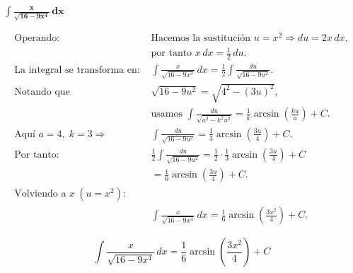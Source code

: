 $\displaystyle \mathbf{\int \frac{x}{\sqrt{16 - 9x^{4}}}\,dx}$

\nopagebreak
$$
\begin{aligned}
\text{Operando: } &
\text{Hacemos la sustitución } u = x^{2} \Rightarrow du = 2x\,dx, \\[6pt]
&\text{por tanto } x\,dx = \tfrac{1}{2}\,du. \\[8pt]
\text{La integral se transforma en: } &
\int \frac{x}{\sqrt{16-9x^{4}}}\,dx
= \tfrac{1}{2}\int \frac{du}{\sqrt{16-9u^{2}}}. \\[8pt]
\text{Notando que } &
\sqrt{16-9u^{2}} = \sqrt{4^{2} - (3u)^{2}}, \\[4pt]
&\text{usamos } \int \frac{du}{\sqrt{a^{2}-k^{2}u^{2}}} = \frac{1}{k}\arcsin\!\left(\frac{k u}{a}\right) + C. \\[8pt]
\text{Aquí } a=4,\; k=3 \Rightarrow &
\int \frac{du}{\sqrt{16-9u^{2}}} = \frac{1}{3}\arcsin\!\left(\frac{3u}{4}\right) + C. \\[8pt]
\text{Por tanto: } &
\tfrac{1}{2}\int \frac{du}{\sqrt{16-9u^{2}}}
= \tfrac{1}{2}\cdot \tfrac{1}{3}\arcsin\!\left(\frac{3u}{4}\right) + C \\[6pt]
&= \tfrac{1}{6}\arcsin\!\left(\frac{3u}{4}\right) + C. \\[8pt]
\text{Volviendo a } x\ (u=x^{2}): &\\[4pt]
&\int \frac{x}{\sqrt{16-9x^{4}}}\,dx
= \tfrac{1}{6}\arcsin\!\left(\frac{3x^{2}}{4}\right) + C.
\end{aligned}
$$

$$
\boxed{\displaystyle 
\int \frac{x}{\sqrt{16-9x^{4}}}\,dx
= \frac{1}{6}\arcsin\!\left(\frac{3x^{2}}{4}\right) + C}
$$
